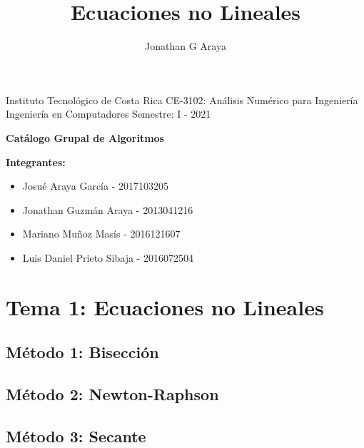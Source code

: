 \documentclass[10pt,a4paper]{article}
\author{Jonathan G Araya}
\title{Ecuaciones no Lineales}
\begin{document}
	Instituto Tecnológico de Costa Rica \hfill CE-3102: Análisis Numérico para Ingeniería\\
	Ingeniería en Computadores \hfill Semestre: I - 2021\\
	
	\begin{center}
		\textbf{\huge Catálogo Grupal de Algoritmos}
	\end{center}
	
	{\bf Integrantes: }
	\begin{itemize}
		\item Josué Araya García - 2017103205
		\item Jonathan Guzmán Araya - 2013041216
		\item Mariano Muñoz Masís - 2016121607
		\item Luis Daniel Prieto Sibaja - 2016072504
	\end{itemize}

	\tableofcontents
	\printindex
	
	\section{Tema 1: Ecuaciones no Lineales}
	
	\subsection{Método 1: Bisección}
	
	
	
	\subsection{Método 2: Newton-Raphson}
		
	
	
	\subsection{Método 3: Secante}
	
	
		
\end{document}
